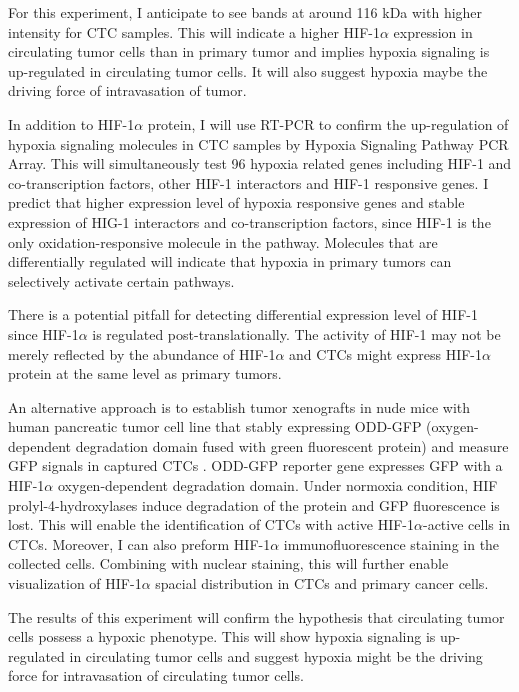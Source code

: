 \documentclass[11pts]{article}
\begin{document}
\noindent For this experiment, I anticipate to see bands at around 116 kDa with higher intensity for CTC samples. This will indicate a higher HIF-1$\alpha$ expression in circulating tumor cells than in primary tumor and implies hypoxia signaling is up-regulated in circulating tumor cells. It will also suggest hypoxia maybe the driving force of intravasation of tumor. 
\newline

\noindent In addition to HIF-1$\alpha$ protein, I will use RT-PCR to confirm the up-regulation of hypoxia signaling molecules in CTC samples by Hypoxia Signaling Pathway PCR Array. This will simultaneously test 96 hypoxia related genes including HIF-1 and co-transcription factors, other HIF-1 interactors and HIF-1 responsive genes. I predict that higher expression level of hypoxia responsive genes and stable expression of HIG-1 interactors and co-transcription factors, since HIF-1 is the only oxidation-responsive molecule in the pathway. Molecules that are differentially regulated will indicate that hypoxia in primary tumors can selectively activate certain pathways. 
\newline

\noindent There is a potential pitfall for detecting differential expression level of HIF-1 since HIF-1$\alpha$ is regulated post-translationally. The activity of HIF-1 may not be merely reflected by the abundance of HIF-1$\alpha$ and CTCs might express HIF-1$\alpha$ protein at the same level as primary tumors. 
\newline

\noindent An alternative approach is to establish tumor xenografts in nude mice with human pancreatic tumor cell line that stably expressing ODD-GFP (oxygen-dependent degradation domain fused with green fluorescent protein) and measure GFP signals in captured CTCs \cite{DAngelo:2003fj}. ODD-GFP reporter gene expresses GFP with a HIF-1$\alpha$ oxygen-dependent degradation domain. Under normoxia condition, HIF prolyl-4-hydroxylases induce degradation of the protein and GFP fluorescence is lost. This will enable the identification of CTCs with active HIF-1$\alpha$-active cells in CTCs. Moreover, I can also preform HIF-1$\alpha$ immunofluorescence staining in the collected cells. Combining with nuclear staining, this will further enable visualization of HIF-1$\alpha$ spacial distribution in CTCs and primary cancer cells. 
\newline

\noindent The results of this experiment will confirm the hypothesis that circulating tumor cells possess a hypoxic phenotype. This will show hypoxia signaling is up-regulated in circulating tumor cells and suggest hypoxia might be the driving force for intravasation of circulating tumor cells.
\newline
\end{document}
